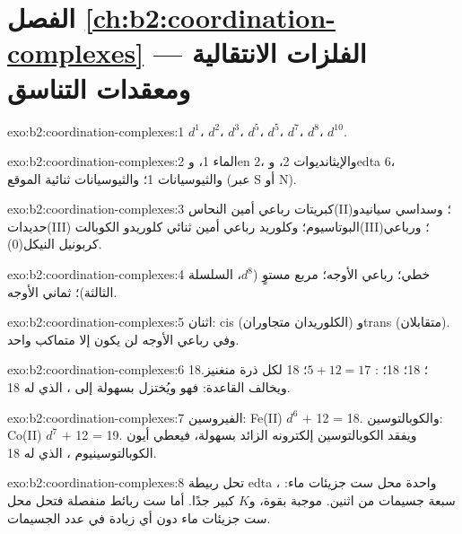 \section*{الفصل \ref{ch:b2:coordination-complexes} --- الفلزات الانتقالية ومعقدات التناسق}

\begin{solution}{exo:b2:coordination-complexes:1}
 $d^1$،  $d^2$،  $d^3$،  $d^5$،  $d^5$، 
$d^7$،  $d^8$،  $d^{10}$.
\end{solution}

\begin{solution}{exo:b2:coordination-complexes:2}
الماء 1، وen 2، والإيثانديوات 2، وedta 6، والثيوسيانات 1؛ والثيوسيانات ثنائية الموقع
(عبر S أو N).
\end{solution}

\begin{solution}{exo:b2:coordination-complexes:3}
كبريتات رباعي أمين النحاس(II)؛ وسداسي سيانيدو حديدات(III) البوتاسيوم؛
وكلوريد رباعي أمين ثنائي كلوريدو الكوبالت(III)؛ ورباعي كربونيل النيكل(0).
\end{solution}

\begin{solution}{exo:b2:coordination-complexes:4}
خطي؛ رباعي الأوجه؛ مربع مستوٍ ($d^8$، السلسلة الثالثة)؛ ثماني الأوجه.
\end{solution}

\begin{solution}{exo:b2:coordination-complexes:5}
اثنان: cis (الكلوريدان متجاوران) وtrans (متقابلان). وفي رباعي الأوجه لن يكون
إلا متماكب واحد.
\end{solution}

\begin{solution}{exo:b2:coordination-complexes:6}
 18؛  18؛  18؛ : $5 + 12 = 17$؛
 18 لكل ذرة منغنيز. ويخالف  القاعدة: فهو  
ويُختزل بسهولة إلى \ce{[V(CO)6]-}، الذي له 18.
\end{solution}

\begin{solution}{exo:b2:coordination-complexes:7}
الفيروسين: Fe(II) $d^6$ + 12 = 18. والكوبالتوسين: Co(II) $d^7$ + 12 = 19. ويفقد الكوبالتوسين
إلكترونه الزائد بسهولة، فيعطي أيون الكوبالتوسينيوم \ce{[Co(C5H5)2]+}، الذي له 18.
\end{solution}

\begin{solution}{exo:b2:coordination-complexes:8}
تحل ربيطة edta واحدة محل ست جزيئات ماء: ، سبعة جسيمات من اثنين.  موجبة بقوة، 
و$K$ كبير جدًا. أما ست ربائط منفصلة فتحل محل ست جزيئات ماء دون أي زيادة في
عدد الجسيمات.
\end{solution}

